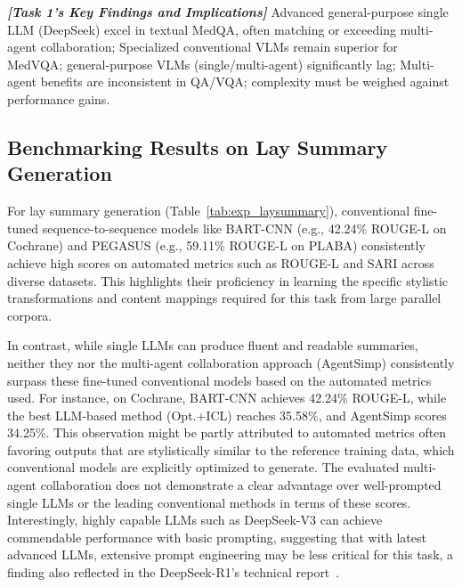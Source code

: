 \documentclass{article}
\begin{document}
\begin{custommdframed}
\textbf{\textit{[Task 1's Key Findings and Implications]}}
 Advanced general-purpose single LLM (DeepSeek) excel in textual MedQA, often matching or exceeding multi-agent collaboration;  Specialized conventional VLMs remain superior for MedVQA; general-purpose VLMs (single/multi-agent) significantly lag;  Multi-agent benefits are inconsistent in QA/VQA; complexity must be weighed against performance gains.
\end{custommdframed}

\subsection{Benchmarking Results on Lay Summary Generation}
For lay summary generation (Table~\ref{tab:exp_laysummary}), conventional fine-tuned sequence-to-sequence models like BART-CNN (e.g., 42.24\% ROUGE-L on Cochrane) and PEGASUS (e.g., 59.11\% ROUGE-L on PLABA) consistently achieve high scores on automated metrics such as ROUGE-L and SARI across diverse datasets. This highlights their proficiency in learning the specific stylistic transformations and content mappings required for this task from large parallel corpora.

In contrast, while single LLMs can produce fluent and readable summaries, neither they nor the multi-agent collaboration approach (AgentSimp) consistently surpass these fine-tuned conventional models based on the automated metrics used. For instance, on Cochrane, BART-CNN achieves 42.24\% ROUGE-L, while the best LLM-based method (Opt.+ICL) reaches 35.58\%, and AgentSimp scores 34.25\%. This observation might be partly attributed to automated metrics often favoring outputs that are stylistically similar to the reference training data, which conventional models are explicitly optimized to generate. The evaluated multi-agent collaboration does not demonstrate a clear advantage over well-prompted single LLMs or the leading conventional methods in terms of these scores. Interestingly, highly capable LLMs such as DeepSeek-V3 can achieve commendable performance with basic prompting, suggesting that with latest advanced LLMs, extensive prompt engineering may be less critical for this task, a finding also reflected in the DeepSeek-R1's technical report~\cite{guo2025deepseekr1}.
\end{document}
